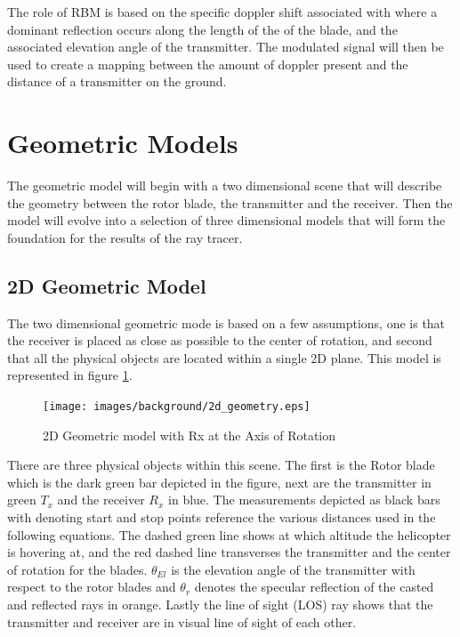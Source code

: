 The role of RBM is based on the specific doppler shift associated with where a dominant reflection occurs along the length of the of the blade, and the associated elevation angle of the transmitter. The modulated signal will then be used to create a mapping between the amount of doppler present and the distance of a transmitter on the ground.

\section{Geometric Models}
The geometric model will begin with a two dimensional scene that will describe the geometry between the rotor blade, the transmitter and the receiver. Then the model will evolve into a selection of three dimensional models that will form the foundation for the results of the ray tracer.

\subsection{2D Geometric Model}
The two dimensional geometric mode is based on a few assumptions, one is that the receiver is placed as close as possible to the center of rotation, and second that all the physical objects are located within a single 2D plane. This model is represented in figure \ref{fig:2D_model}.

\begin{figure}[h]
	\begin{center}
		\texttt{[image: images/background/2d\_geometry.eps]}
		\caption{2D Geometric model with Rx at the Axis of Rotation}
		\label{fig:2D_model}
	\end{center}
\end{figure}

There are three physical objects within this scene. The first is the Rotor blade which is the dark green bar depicted in the figure, next are the transmitter in green $T_x$ and the receiver $R_x$ in blue. The measurements depicted as black bars with denoting start and stop points reference the various distances used in the following equations. The dashed green line shows at which altitude the helicopter is hovering at, and the red dashed line transverses the transmitter and the center of rotation for the blades. $\theta_{El}$ is the elevation angle of the transmitter with respect to the rotor blades and $\theta_r$ denotes the specular reflection of the casted and reflected rays in orange. Lastly the line of sight (LOS) ray shows that the transmitter and receiver are in visual line of sight of each other.

